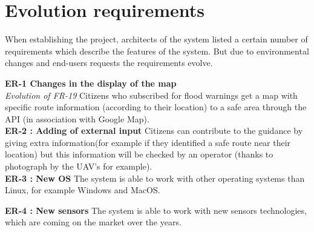 \section{Evolution requirements}
When establishing the project, architects of the system listed a certain number of requirements which describe the features of the system. But due to environmental changes and end-users requests the requirements evolve.

\textbf{ER-1 Changes in the display of the map } \\
\textit { Evolution of FR-19 } Citizens who subscribed for flood warnings get a map with specific route information (according to their location) to a safe area through the API (in association with Google Map). \\

\textbf{ER-2 : Adding of external input} Citizens can contribute to the guidance by giving extra information(for example if they identified a safe route near their location) but this information will be checked by an operator (thanks to photograph by the UAV's for example). \\

\textbf{ER-3 : New OS } The system is able to work with other operating systems than Linux, for example Windows and MacOS. %


\textbf{ER-4 : New sensors } The system is able to work with new sensors technologies, which are coming on the market over the years.